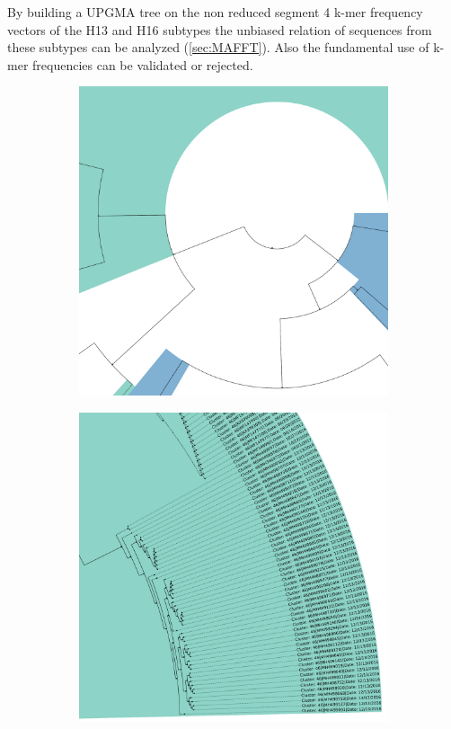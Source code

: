 By building a \gls{UPGMA} tree on the non reduced segment 4 k-mer frequency vectors of the H13 and H16 subtypes the unbiased relation of sequences from these subtypes can be analyzed (\autoref{sec:MAFFT}). Also the fundamental use of k-mer frequencies can be validated or rejected. 
\begin{figure}[!hbt]
    \centering
    \begin{subfigure}[t]{0.38\textwidth}
        \caption{}
        \includegraphics[width=\textwidth]{Graphics/root.pdf}
    \end{subfigure}
    \hfill
    \begin{subfigure}[t]{0.38\textwidth}
        \caption{}
        \includegraphics[width=\textwidth]{Graphics/identical.pdf}

\end{subfigure}
\end{figure}
